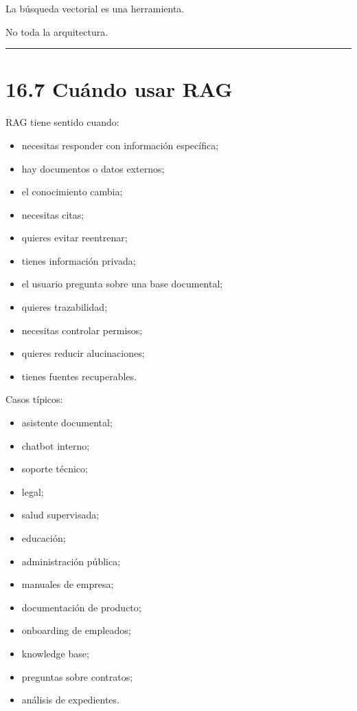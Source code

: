La búsqueda vectorial es una herramienta.

No toda la arquitectura.

\begin{center}\rule{0.5\linewidth}{0.5pt}\end{center}

\section{16.7 Cuándo usar RAG}\label{cuuxe1ndo-usar-rag}

RAG tiene sentido cuando:

\begin{itemize}
\tightlist
\item
  necesitas responder con información específica;
\item
  hay documentos o datos externos;
\item
  el conocimiento cambia;
\item
  necesitas citas;
\item
  quieres evitar reentrenar;
\item
  tienes información privada;
\item
  el usuario pregunta sobre una base documental;
\item
  quieres trazabilidad;
\item
  necesitas controlar permisos;
\item
  quieres reducir alucinaciones;
\item
  tienes fuentes recuperables.
\end{itemize}

Casos típicos:

\begin{itemize}
\tightlist
\item
  asistente documental;
\item
  chatbot interno;
\item
  soporte técnico;
\item
  legal;
\item
  salud supervisada;
\item
  educación;
\item
  administración pública;
\item
  manuales de empresa;
\item
  documentación de producto;
\item
  onboarding de empleados;
\item
  knowledge base;
\item
  preguntas sobre contratos;
\item
  análisis de expedientes.
\end{itemize}


